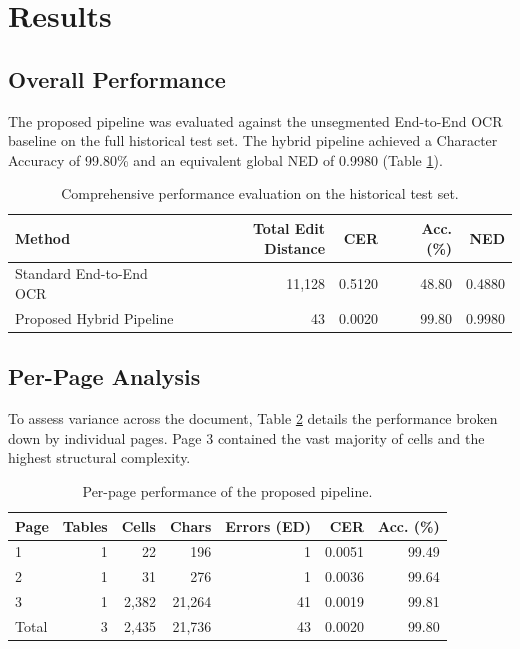 \documentclass[pdflatex,sn-mathphys-num]{sn-jnl}
\begin{document}

\section{Results}
\label{sec:results}

\subsection{Overall Performance}
The proposed pipeline was evaluated against the unsegmented End-to-End OCR baseline on the full historical test set. The hybrid pipeline achieved a Character Accuracy of 99.80\% and an equivalent global NED of 0.9980 (Table \ref{tab:main_results}).

\begin{table}[htbp]
\centering
\caption{Comprehensive performance evaluation on the historical test set.}
\label{tab:main_results}
\begin{tabular}{lrrrr}
\toprule
\textbf{Method} & \textbf{Total Edit Distance} & \textbf{CER} & \textbf{Acc. (\%)} & \textbf{NED} \\
\midrule
Standard End-to-End OCR & 11,128 & 0.5120 & 48.80 & 0.4880 \\
Proposed Hybrid Pipeline & 43 & 0.0020 & 99.80 & 0.9980 \\
\bottomrule
\end{tabular}
\end{table}

\subsection{Per-Page Analysis}
To assess variance across the document, Table \ref{tab:page_results} details the performance broken down by individual pages. Page 3 contained the vast majority of cells and the highest structural complexity.

\begin{table}[htbp]
\centering
\caption{Per-page performance of the proposed pipeline.}
\label{tab:page_results}
\begin{tabular}{lrrrrrr}
\toprule
\textbf{Page} & \textbf{Tables} & \textbf{Cells} & \textbf{Chars} & \textbf{Errors (ED)} & \textbf{CER} & \textbf{Acc. (\%)} \\
\midrule
1 & 1 & 22 & 196 & 1 & 0.0051 & 99.49 \\
2 & 1 & 31 & 276 & 1 & 0.0036 & 99.64 \\
3 & 1 & 2,382 & 21,264 & 41 & 0.0019 & 99.81 \\
\midrule
Total & 3 & 2,435 & 21,736 & 43 & 0.0020 & 99.80 \\
\bottomrule
\end{tabular}
\end{table}
\end{document}
